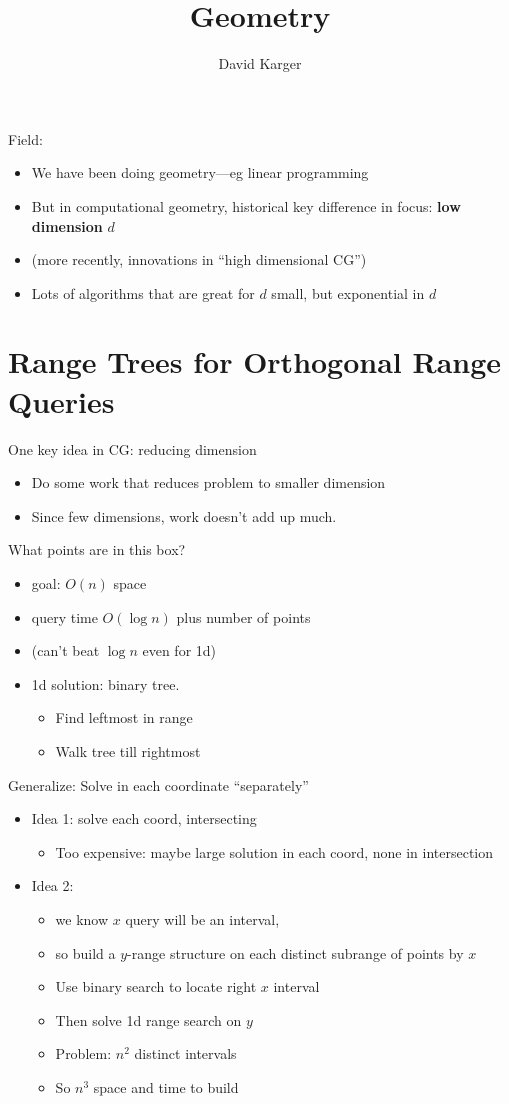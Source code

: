 \documentclass{article}
\title{Geometry}
\author{David Karger}
\begin{document}
Field:
\begin{itemize}
\item We have been doing geometry---eg linear programming
\item But in computational geometry, historical key difference in focus: \textbf{low dimension} $d$
\item (more recently, innovations in ``high dimensional CG'')
\item Lots of algorithms that are great for $d$ small, but exponential
  in $d$
\end{itemize}

\newcommand{\conv}{\mathit{conv}}


\section{Range Trees for Orthogonal Range Queries}

One key idea in CG: reducing dimension
\begin{itemize}
\item Do some work that reduces problem to smaller dimension
\item Since few dimensions, work doesn't add up much.
\end{itemize}

What points are in this box?
\begin{itemize}
\item goal: $O(n)$ space
\item query time $O(\log n)$ plus number of points
\item (can't beat $\log n$ even for 1d)
\item 1d solution: binary tree.  
\begin{itemize}
\item Find leftmost in range
\item Walk tree till rightmost
\end{itemize}
\end{itemize}


Generalize: Solve in each coordinate ``separately'' %
\begin{itemize}
\item Idea 1: solve each coord, intersecting
\begin{itemize}
\item Too expensive: maybe large solution in each coord, none in
  intersection
\end{itemize}
\item Idea 2: 
\begin{itemize}
\item we know $x$ query will be an interval, 
\item so build a $y$-range structure on each distinct subrange of
  points by $x$
\item Use binary search to locate right $x$ interval
\item Then solve 1d range search on $y$
\item Problem: $n^2$ distinct intervals
\item So $n^3$ space and time to build
\end{itemize}
\end{itemize}
\end{document}
